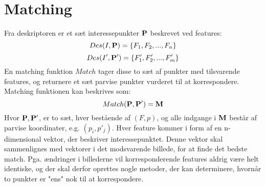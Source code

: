 \section{Matching}
Fra deskriptoren er et sæt interessepunkter $\bold{P}$ beskrevet ved features:
$$ Des(I,\bold{P})= \lbrace F_1,F_2,...,F_n \rbrace $$
$$ Des(I',\bold{P'})=\lbrace F'_1,F'_2,...,F'_m \rbrace $$
En matching funktion $Match$  tager disse to sæt af punkter med tilsvarende features, og returnere et sæt parvise punkter vurderet til at korrespondere. Matching funktionen kan beskrives som:
\begin{equation}
Match(\bold{P}, \bold{P}') = \bold{M}
\end{equation}
Hvor $\bold{P}, \bold{P}'$, er to sæt, hver bestående af $(F, p)$, og alle indgange i $\bold{M}$ består af parvise koordinater, e.g. $(p_i, p'_j)$. Hver feature kommer i form af en n-dimensional vektor, der beskriver interessepunktet. Denne vektor skal sammenlignes med vektorer i det modsvarende billede, for at finde det bedste match. Pga. ændringer i billederne vil korresponderende features aldrig være helt identiske, og der skal derfor oprettes nogle metoder, der kan determinere, hvornår to punkter er "ens" nok til at korrespondere.